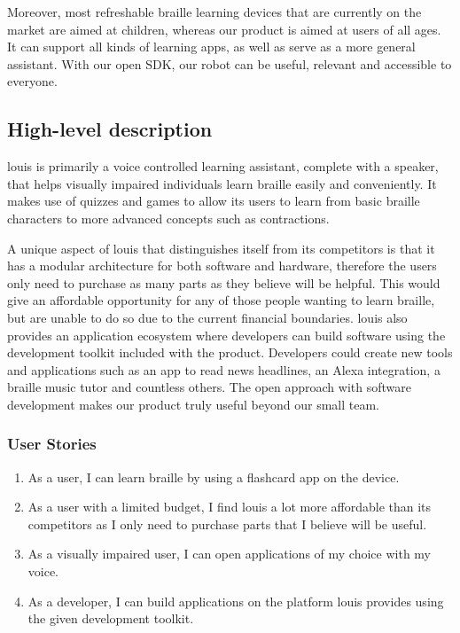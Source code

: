 \documentclass{article}
\begin{document}
Moreover, most refreshable braille learning devices that are currently on the market are aimed at children, whereas our product is aimed at users of all ages. It can support all kinds of learning apps, as well as serve as a more general assistant. With our open SDK, our robot can be useful, relevant and accessible to everyone.


\subsection{High-level description} 

louis is primarily a voice controlled learning assistant, complete with a speaker, that helps visually impaired individuals learn braille easily and conveniently. It makes use of quizzes and games to allow its users to learn from basic braille characters to more advanced concepts such as contractions.

A unique aspect of louis that distinguishes itself from its competitors is that it has a modular architecture for both software and hardware, therefore the users only need to purchase as many parts as they believe will be helpful. This would give an affordable opportunity for any of those people wanting to learn braille, but are unable to do so due to the current financial boundaries. louis also provides an application ecosystem where developers can build software using the development toolkit included with the product. Developers could create new tools and applications such as an app to read news headlines, an Alexa integration, a braille music tutor and countless others. The open approach with software development makes our product truly useful beyond our small team.

\subsubsection{User Stories}

\begin{enumerate}
  \item As a user, I can learn braille by using a flashcard app on the device.
  \item As a user with a limited budget, I find louis a lot more affordable than its competitors as I only need to purchase parts that I believe will be useful.
  \item As a visually impaired user, I can open applications of my choice with my voice.
  \item As a developer, I can build applications on the platform louis provides using the given development toolkit.
\end{enumerate}
\end{document}
